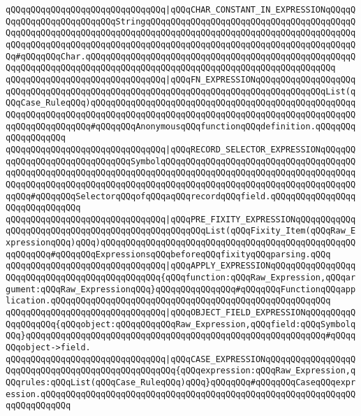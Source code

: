 \verb|qQQqqQQqqQQqqQQqqQQqqQQqqQQqqQQq|\verb#|qQQqCHAR_CONSTANT_IN_EXPRESSIONqQQqqQQqqQQqqQQqqQQqqQQqqQQqStringqQQqqQQqqQQqqQQqqQQqqQQqqQQqqQQqqQQqqQQqqQQqqQQqqQQqqQQqqQQqqQQqqQQqqQQqqQQqqQQqqQQqqQQqqQQqqQQqqQQqqQQqqQQqqQQqqQQqqQQqqQQqqQQqqQQqqQQqqQQqqQQqqQQqqQQqqQQqqQQqqQQqqQQqqQQqqQQqqQQqqQQq#\verb|#qQQqqQQqChar.qQQqqQQqqQQqqQQqqQQqqQQqqQQqqQQqqQQqqQQqqQQqqQQqqQQqqQQqqQQqqQQqqQQqqQQqqQQqqQQqqQQqqQQqqQQqqQQqqQQqqQQqqQQqqQQqqQQqqQQq|\newline
\verb|qQQqqQQqqQQqqQQqqQQqqQQqqQQqqQQq|\verb#|qQQqFN_EXPRESSIONqQQqqQQqqQQqqQQqqQQqqQQqqQQqqQQqqQQqqQQqqQQqqQQqqQQqqQQqqQQqqQQqqQQqqQQqqQQqqQQqqQQqList(qQQqCase_RuleqQQq)qQQqqQQqqQQqqQQqqQQqqQQqqQQqqQQqqQQqqQQqqQQqqQQqqQQqqQQqqQQqqQQqqQQqqQQqqQQqqQQqqQQqqQQqqQQqqQQqqQQqqQQqqQQqqQQqqQQqqQQqqQQqqQQqqQQqqQQqqQQq#\verb|#qQQqqQQqAnonymousqQQqfunctionqQQqdefinition.qQQqqQQqqQQqqQQqqQQq|\newline
\verb|qQQqqQQqqQQqqQQqqQQqqQQqqQQqqQQq|\verb#|qQQqRECORD_SELECTOR_EXPRESSIONqQQqqQQqqQQqqQQqqQQqqQQqqQQqqQQqSymbolqQQqqQQqqQQqqQQqqQQqqQQqqQQqqQQqqQQqqQQqqQQqqQQqqQQqqQQqqQQqqQQqqQQqqQQqqQQqqQQqqQQqqQQqqQQqqQQqqQQqqQQqqQQqqQQqqQQqqQQqqQQqqQQqqQQqqQQqqQQqqQQqqQQqqQQqqQQqqQQqqQQqqQQqqQQqqQQqqQQqqQQq#\verb|#qQQqqQQqSelectorqQQqofqQQqaqQQqrecordqQQqfield.qQQqqQQqqQQqqQQqqQQqqQQqqQQqqQQq|\newline
\verb|qQQqqQQqqQQqqQQqqQQqqQQqqQQqqQQq|\verb#|qQQqPRE_FIXITY_EXPRESSIONqQQqqQQqqQQqqQQqqQQqqQQqqQQqqQQqqQQqqQQqqQQqqQQqqQQqList(qQQqFixity_Item(qQQqRaw_ExpressionqQQq)qQQq)qQQqqQQqqQQqqQQqqQQqqQQqqQQqqQQqqQQqqQQqqQQqqQQqqQQqqQQqqQQq#\verb|#qQQqqQQqExpressionsqQQqbeforeqQQqfixityqQQqparsing.qQQq|\newline
\verb|qQQqqQQqqQQqqQQqqQQqqQQqqQQqqQQq|\verb#|qQQqAPPLY_EXPRESSIONqQQqqQQqqQQqqQQqqQQqqQQqqQQqqQQqqQQqqQQqqQQqqQQq{qQQqfunction:qQQqRaw_Expression,qQQqargument:qQQqRaw_ExpressionqQQq}qQQqqQQqqQQqqQQq#\verb|#qQQqqQQqFunctionqQQqapplication.qQQqqQQqqQQqqQQqqQQqqQQqqQQqqQQqqQQqqQQqqQQqqQQqqQQqqQQq|\newline
\verb|qQQqqQQqqQQqqQQqqQQqqQQqqQQqqQQq|\verb#|qQQqOBJECT_FIELD_EXPRESSIONqQQqqQQqqQQqqQQqqQQq{qQQqobject:qQQqqQQqqQQqRaw_Expression,qQQqfield:qQQqSymbolqQQq}qQQqqQQqqQQqqQQqqQQqqQQqqQQqqQQqqQQqqQQqqQQqqQQqqQQqqQQqqQQq#\verb|#qQQqqQQqobject->field.|\newline
\verb|qQQqqQQqqQQqqQQqqQQqqQQqqQQqqQQq|\verb#|qQQqCASE_EXPRESSIONqQQqqQQqqQQqqQQqqQQqqQQqqQQqqQQqqQQqqQQqqQQqqQQqqQQq{qQQqexpression:qQQqRaw_Expression,qQQqrules:qQQqList(qQQqCase_RuleqQQq)qQQq}qQQqqQQq#\verb|#qQQqqQQqCaseqQQqexpression.qQQqqQQqqQQqqQQqqQQqqQQqqQQqqQQqqQQqqQQqqQQqqQQqqQQqqQQqqQQqqQQqqQQqqQQqqQQq|\newline
